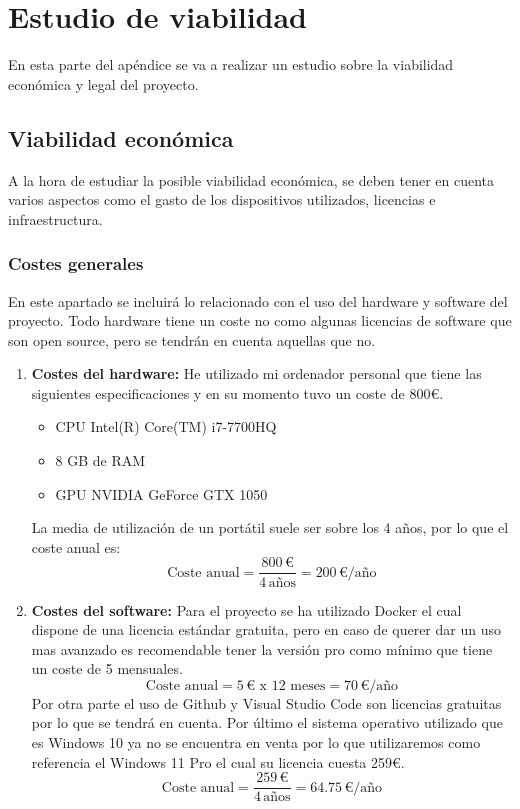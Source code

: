 \section{Estudio de viabilidad}
En esta parte del apéndice se va a realizar un estudio sobre la viabilidad económica y legal del proyecto.
\subsection{Viabilidad económica}
A la hora de estudiar la posible viabilidad económica, se deben tener en cuenta varios aspectos como el gasto de los dispositivos utilizados, licencias e infraestructura.
\subsubsection{Costes generales}
En este apartado se incluirá lo relacionado con el uso del hardware y software del proyecto. Todo hardware tiene un coste no como algunas licencias de software que son open source, pero se tendrán en cuenta aquellas que no.
\begin{enumerate}
    \item \textbf{Costes del hardware:} He utilizado mi ordenador personal que tiene las siguientes especificaciones y en su momento tuvo un coste de 800€.
    \begin{itemize}
        \item CPU Intel(R) Core(TM) i7-7700HQ
        \item 8 GB de RAM
        \item GPU NVIDIA GeForce GTX 1050
    \end{itemize}
    La media de utilización de un portátil suele ser sobre los 4 años, por lo que el coste anual es:
    \begin{equation}
        \text{Coste anual} = \frac{800\,\text{€}}{4\,\text{años}} = 200\,\text{€/año}
    \end{equation}
    \item \textbf{Costes del software:} Para el proyecto se ha utilizado Docker el cual dispone de una licencia estándar gratuita, pero en caso de querer dar un uso mas avanzado es recomendable tener la versión pro como mínimo que tiene un coste de 5  mensuales.
     \begin{equation}
        \text{Coste anual} = 5\,\text{€ x 12 meses} = 70\,\text{€/año}
    \end{equation}
    Por otra parte el uso de Github y Visual Studio Code son licencias gratuitas por lo que se tendrá en cuenta. Por último el sistema operativo utilizado que es Windows 10 ya no se encuentra en venta por lo que utilizaremos como referencia el Windows 11 Pro el cual su licencia cuesta 259€.
    \begin{equation}
        \text{Coste anual} = \frac{259\,\text{€}}{4\,\text{años}} = 64.75\,\text{€/año}
    \end{equation}
\end{enumerate}
